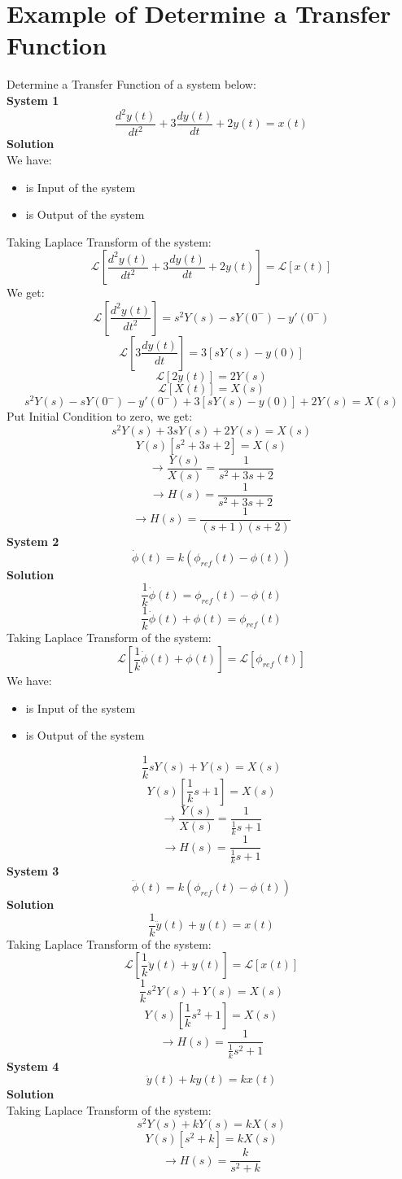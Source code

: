 \documentclass[12pt,a4paper]{article}
\begin{document}
	\section{Example of Determine a Transfer Function}
	Determine a Transfer Function of a system below:\\
	\textbf{System 1}
	\[\frac{d^2y(t)}{d t^2} + 3\frac{dy(t)}{d t} + 2 y(t) = x(t)\]
	\textbf{Solution}\\
	We have:
	\begin{itemize}
		\item { is Input of the system}
		\item { is Output of the system}
	\end{itemize}
	Taking Laplace Transform of the system:
	\[\mathcal{L}[\frac{d^2y(t)}{d t^2} + 3\frac{dy(t)}{d t} + 2 y(t)] = \mathcal{L}[x(t)]\]
	We get:
	\[\mathcal{L}[\frac{d^2y(t)}{d t^2}] = s^2Y(s) - sY(0^-) -y'(0^-)\]
	\[\mathcal{L}[3\frac{dy(t)}{d t}] = 3[sY(s) - y(0)]\]
	\[\mathcal{L}[2 y(t)] = 2Y(s)\]
	\[\mathcal{L}[X(t)] = X(s)\]
	\[s^2Y(s) - sY(0^-) -y'(0^-) + 3[sY(s) - y(0)] + 2Y(s) = X(s)\]
	Put Initial Condition to zero, we get:
	\[s^2Y(s) + 3sY(s) + 2Y(s) = X(s)\]
	\[Y(s)[s^2 + 3s +2 ] = X(s)\]
	\[\rightarrow \frac{Y(s)}{X(s)} = \frac{1}{s^2 + 3s +2}\]
	\[\rightarrow H(s) = \frac{1}{s^2 + 3s +2}\]
	\[\rightarrow \boxed{H(s) = \frac{1}{(s+1)(s+2)}}\]
	\textbf{System 2}
	\[\dot{\phi}(t) = k(\phi_{ref}(t) - \phi(t))\]
	\textbf{Solution}\\
	\[\frac{1}{k}\dot{\phi}(t) = \phi_{ref}(t) - \phi(t)\]
	\[\frac{1}{k}\dot{\phi}(t) + \phi(t) = \phi_{ref}(t)\]
	Taking Laplace Transform of the system:
	\[\mathcal{L}[\frac{1}{k}\dot{\phi}(t) + \phi(t)] = \mathcal{L}[\phi_{ref}(t)]\]
	We have:
	\begin{itemize}
		\item { is Input of the system}
		\item { is Output of the system}
	\end{itemize}
	\[\frac{1}{k}sY(s) + Y(s) = X(s)\]
	\[Y(s)[\frac{1}{k}s +1] = X(s)\]
	\[\rightarrow \frac{Y(s)}{X(s)} = \frac{1}{\frac{1}{k}s + 1}\]
	\[\rightarrow \boxed{H(s) = \frac{1}{\frac{1}{k}s + 1}}\]
	\textbf{System 3}
	\[\ddot{\phi}(t) = k(\phi_{ref}(t) - \phi(t))\]
	\textbf{Solution}
	\[\frac{1}{k}\ddot{y}(t) + y(t) = x(t)\]
	Taking Laplace Transform of the system:
	\[\mathcal{L}[\frac{1}{k}\ddot{y}(t) + y(t)] = \mathcal{L}[x(t)]\]
	\[\frac{1}{k}s^2Y(s) + Y(s) = X(s)\]
	\[Y(s)[\frac{1}{k}s^2 + 1] = X(s)\]
	\[\rightarrow \boxed{H(s) = \frac{1}{\frac{1}{k}s^2 + 1}}\]
	\textbf{System 4}
	\[\ddot{y}(t) + ky(t)= kx(t)\]
	\textbf{Solution}\\
	Taking Laplace Transform of the system:
	\[s^2Y(s) + kY(s) = kX(s)\]
	\[Y(s)[s^2 + k] = kX(s)\]
	\[\rightarrow \boxed{H(s) = \frac{k}{s^2 + k}}\]
	
\end{document}
